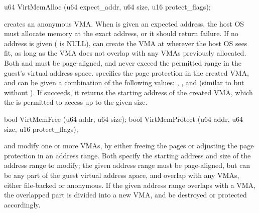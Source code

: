 \begin{paldef}
u64  VirtMemAlloc   (u64 expect_addr, u64 size, u16 protect_flags);
\end{paldef}


 creates an anonymous VMA. When  is given an expected address, the host OS must allocate memory at the exact address,
or it should return failure.
If no address is given ( is NULL),  can create the VMA at wherever the host OS sees fit, as long as the VMA does not overlap with any VMAs previously allocated.
Both  and 
must be page-aligned, and never exceed the permitted range in the guest's virtual address space.
 specifies the page protection in the created VMA, and can be given a combination of the following values: , , and  (similar to  but without ).
If  succeeds, it returns the starting address
of the created VMA, which the \libos{} is permitted to access up to the given size.





\begin{paldef}
bool VirtMemFree    (u64 addr, u64 size);
bool VirtMemProtect (u64 addr, u64 size, u16 protect_flags);
\end{paldef}


 and  modify one or more VMAs, 
by either freeing the pages
or adjusting the page protection in an address range.
Both \hostapis{} specify the starting address and size of the address range to modify;
the given address range must be page-aligned,
but can be any part of the guest virtual address apace,
and overlap with any VMAs, either file-backed or anonymous.
If the given address range overlaps with a VMA, the overlapped part is divided into a new VMA, and be destroyed or protected accordingly.


 





